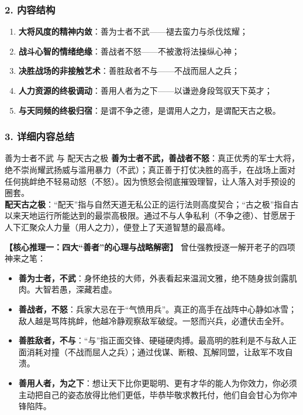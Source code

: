 \subsubsection{2. 内容结构}
\begin{enumerate}
    \item \textbf{大将风度的精神内敛}：善为士者不武——褪去蛮力与杀伐炫耀；
    \item \textbf{战斗心智的情绪绝缘}：善战者不怒——不被激将法操纵心神；
    \item \textbf{决胜战场的非接触艺术}：善胜敌者不与——不战而屈人之兵；
    \item \textbf{人力资源的终极调动}：善用人者为之下——以谦逊身段驾驭天下英才；
    \item \textbf{与天同频的终极归宿}：是谓不争之德，是谓用人之力，是谓配天古之极。
\end{enumerate}

\subsubsection{3. 详细内容总结}

\begin{ConceptBox}{善为士者不武 与 配天古之极}
\textbf{善为士者不武，善战者不怒}：真正优秀的军士大将，绝不崇尚耀武扬威与滥用暴力（不武）；真正善于打仗决胜的高手，在战场上面对任何挑衅绝不轻易动怒（不怒）。因为愤怒会彻底摧毁理智，让人落入对手预设的圈套。\\
\textbf{配天古之极}：“配天”指与自然天道无私公正的运行法则高度契合；“古之极”指自古以来天地运行所能达到的最崇高极限。通过不与人争私利（不争之德）、甘愿居于人下汇聚众人力量（用人之力），便登上了天道智慧的最高峰。
\end{ConceptBox}

\noindent\textbf{【核心推理一：四大“善者”的心理与战略解密】}
曾仕强教授逐一解开老子的四项神来之笔：
\begin{itemize}
    \item \textbf{善为士者，不武}：身怀绝技的大师，外表看起来温润文雅，绝不随身拔剑露肌肉。大智若愚，深藏若虚。
    \item \textbf{善战者，不怒}：兵家大忌在于“气愤用兵”。真正的高手在战阵中心静如冰雪；敌人越是骂阵挑衅，他越冷静观察敌军破绽。一怒而兴兵，必遭伏击全歼。
    \item \textbf{善胜敌者，不与}：“与”指正面交锋、硬碰硬肉搏。最高明的胜利是不与敌人正面消耗对撞（不战而屈人之兵）；通过伐谋、断粮、瓦解同盟，让敌军不攻自溃。
    \item \textbf{善用人者，为之下}：想让天下比你更聪明、更有才华的能人为你效力，你必须主动把自己的姿态放得比他们更低，毕恭毕敬求教托付，他们自会甘心为你冲锋陷阵。
\end{itemize}

